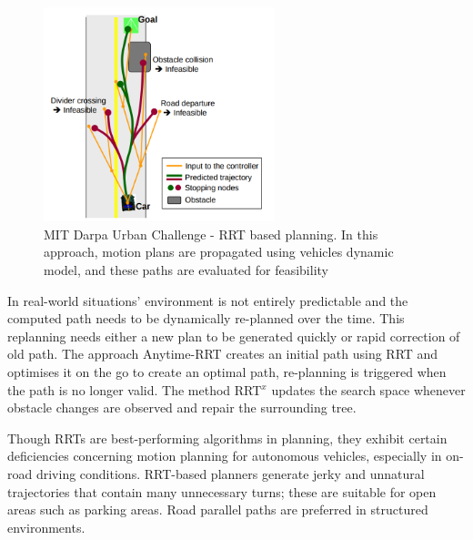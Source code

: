 \begin{figure}
	\centering
	\includegraphics[width=0.6\textwidth]{Images/related_work/mit_urban_planning.png}
	\caption{MIT Darpa Urban Challenge - RRT based planning. In this approach, motion plans are propagated using vehicles dynamic model, and these paths are evaluated for feasibility}
	\label{mit_rrt_fig}
\end{figure} 

In real-world situations' environment is not entirely predictable and the computed path needs to be dynamically re-planned over the time. This replanning needs either a new plan to be generated quickly or rapid correction of old path. The approach Anytime-RRT \cite{anytimerrt} creates an initial path using RRT and optimises it on the go to create an optimal path, re-planning is triggered when the path is no longer valid. The method RRT$^x$ \cite{rrtx} updates the search space whenever obstacle changes are observed and repair the surrounding tree. 

Though RRTs are best-performing algorithms in planning, they exhibit certain deficiencies concerning motion planning for autonomous vehicles, especially in on-road driving conditions. RRT-based planners generate jerky and unnatural trajectories that contain many unnecessary turns\cite{improved_rrt}; these are suitable for open areas such as parking areas. Road parallel paths are preferred in structured environments.

